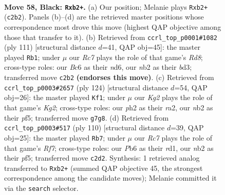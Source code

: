 \documentclass[11pt]{article}
\begin{document}
\clearpage

\begin{figure}[p]\centering
\begin{subfigure}{0.46\textwidth}\centering
\resizebox{\linewidth}{!}{%
\newchessgame
\chessboard[
  setfen={8/6k1/1pb5/p1p5/8/1K4PN/1Nr1rp1P/5R2 b - - 3 58},
  showmover=false,
  pgfstyle=straightmove, color=movearrow, markmove={c2-b2}
]}
\caption{}
\end{subfigure}\hfill
\begin{subfigure}{0.46\textwidth}\centering
\resizebox{\linewidth}{!}{%
\newchessgame
\chessboard[
  setfen={1k6/1p4R1/3Np3/p6p/3P4/3B3P/2K5/3rr3 b - - 10 56},
  showmover=false,
  pgfstyle=straightmove, color=movearrow, markmove={d1-b1}
]}
\caption{}
\end{subfigure}
\\[4pt]
\begin{subfigure}{0.46\textwidth}\centering
\resizebox{\linewidth}{!}{%
\newchessgame
\chessboard[
  setfen={3R4/7p/2k3p1/P2R1p2/5P2/3p2P1/rn4K1/8 w - - 3 63},
  showmover=false,
  pgfstyle=straightmove, color=movearrow, markmove={g2-f1}
]}
\caption{}
\end{subfigure}\hfill
\begin{subfigure}{0.46\textwidth}\centering
\resizebox{\linewidth}{!}{%
\newchessgame
\chessboard[
  setfen={2n1k3/5RR1/7p/p3pp2/8/2r2P2/2P3PK/3r4 w - - 8 56},
  showmover=false,
  pgfstyle=straightmove, color=movearrow, markmove={f7-b7}
]}
\caption{}
\end{subfigure}
\caption{\textbf{Move 58, Black: \texttt{Rxb2+}.} (a) Our position; Melanie plays \texttt{Rxb2+} (\texttt{c2b2}). Panels (b)--(d) are the retrieved master positions whose correspondence most drove this move (highest QAP objective among those that transfer to it). (b) Retrieved from \texttt{ccrl\_top\_p0001\#1082} (ply 111) [structural distance $d$=41, QAP obj=45]: the master played \texttt{Rb1}; under $\mu$ our \emph{Rc7} plays the role of that game's \emph{Rd8}; cross-type roles: our \emph{B}c6 as their \emph{n}d6, our \emph{n}b2 as their \emph{b}d3; transferred move \texttt{c2b2} \textbf{(endorses this move)}. (c) Retrieved from \texttt{ccrl\_top\_p0003\#2657} (ply 124) [structural distance $d$=54, QAP obj=26]: the master played \texttt{Kf1}; under $\mu$ our \emph{Kg2} plays the role of that game's \emph{Kg2}; cross-type roles: our \emph{p}h2 as their \emph{r}a2, our \emph{n}b2 as their \emph{p}f5; transferred move \texttt{g7g8}. (d) Retrieved from \texttt{ccrl\_top\_p0003\#517} (ply 110) [structural distance $d$=39, QAP obj=25]: the master played \texttt{Rb7}; under $\mu$ our \emph{Rc7} plays the role of that game's \emph{Rf7}; cross-type roles: our \emph{P}b6 as their \emph{r}d1, our \emph{n}b2 as their \emph{p}f5; transferred move \texttt{c2d2}. Synthesis: 1 retrieved analog transferred to \texttt{Rxb2+} (summed QAP objective 45, the strongest correspondence among the candidate moves); Melanie committed it via the \texttt{search} selector.}
\label{fig:thought-m115}
\end{figure}
\end{document}
